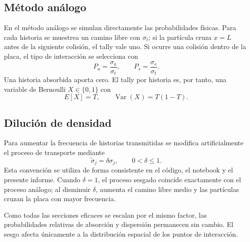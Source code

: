 \documentclass[11pt]{article}
\begin{document}
\subsection{Método análogo}
En el método análogo se simulan directamente las probabilidades físicas. Para cada historia se muestrea un camino libre con $\sigma_t$; si la partícula cruza $x=L$ antes de la siguiente colisión, el tally vale uno. Si ocurre una colisión dentro de la placa, el tipo de interacción se selecciona con
\begin{equation}
    P_a=\frac{\sigma_a}{\sigma_t},\qquad
    P_s=\frac{\sigma_s}{\sigma_t}.
\end{equation}
Una historia absorbida aporta cero. El tally por historia es, por tanto, una variable de Bernoulli $X\in\{0,1\}$ con
\begin{equation}
    E[X]=T,
    \qquad
    \operatorname{Var}(X)=T(1-T).
    \label{eq:analogvar}
\end{equation}

\subsection{Dilución de densidad}
Para aumentar la frecuencia de historias transmitidas se modifica artificialmente el proceso de transporte mediante
\begin{equation}
    \boxed{\tilde\sigma_j=\delta\sigma_j,\qquad 0<\delta\le1.}
    \label{eq:dilution}
\end{equation}
Esta convención se utiliza de forma consistente en el código, el notebook y el presente informe. Cuando $\delta=1$, el proceso sesgado coincide exactamente con el proceso análogo; al disminuir $\delta$, aumenta el camino libre medio y las partículas cruzan la placa con mayor frecuencia.

Como todas las secciones eficaces se escalan por el mismo factor, las probabilidades relativas de absorción y dispersión permanecen sin cambio. El sesgo afecta únicamente a la distribución espacial de los puntos de interacción.
\end{document}
